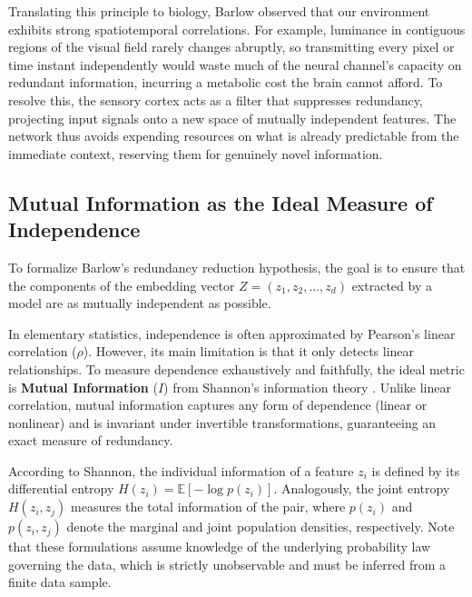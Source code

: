 \documentclass[11pt, oneside, openany]{book}
\begin{document}
Translating this principle to biology, Barlow observed that our environment exhibits strong spatiotemporal correlations. For example, luminance in contiguous regions of the visual field rarely changes abruptly, so transmitting every pixel or time instant independently would waste much of the neural channel's capacity on redundant information, incurring a metabolic cost the brain cannot afford. To resolve this, the sensory cortex acts as a filter that suppresses redundancy, projecting input signals onto a new space of mutually independent features. The network thus avoids expending resources on what is already predictable from the immediate context, reserving them for genuinely novel information.

\subsection{Mutual Information as the Ideal Measure of Independence}
\label{sec:5.1.1}

To formalize Barlow's redundancy reduction hypothesis, the goal is to ensure that the components of the embedding vector $Z = (z_{1}, z_{2}, \dots, z_{d})$ extracted by a model are as mutually independent as possible.

In elementary statistics, independence is often approximated by Pearson's linear correlation ($\rho$). However, its main limitation is that it only detects linear relationships. To measure dependence exhaustively and faithfully, the ideal metric is \textbf{Mutual Information} ($I$) from Shannon's information theory \cite{shannon1948mathematical}. Unlike linear correlation, mutual information captures any form of dependence (linear or nonlinear) and is invariant under invertible transformations, guaranteeing an exact measure of redundancy.

According to Shannon, the individual information of a feature $z_{i}$ is defined by its differential entropy $H(z_{i}) = \mathbb{E}[-\log p(z_{i})]$. Analogously, the joint entropy $H(z_{i}, z_{j})$ measures the total information of the pair, where $p(z_{i})$ and $p(z_{i}, z_{j})$ denote the marginal and joint population densities, respectively. Note that these formulations assume knowledge of the underlying probability law governing the data, which is strictly unobservable and must be inferred from a finite data sample.
\end{document}
